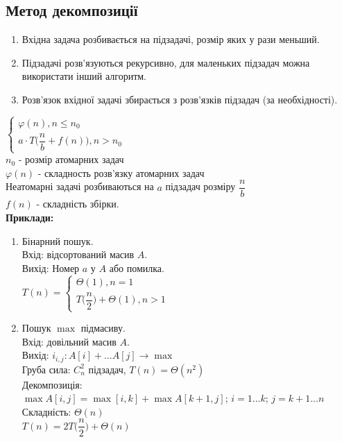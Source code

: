 \documentclass[a4paper,12pt]{article}
\begin{document}
    \subsection{Метод декомпозиції}
    \begin{enumerate}
        \item Вхідна задача розбивається на підзадачі, розмір яких у рази меньший.
        \item Підзадачі розв'язуються рекурсивно, для маленьких підзадач можна використати інший алгоритм.
        \item Розв'язок вхідної задачі збирається з розв'язків підзадач (за необхідності).
    \end{enumerate}
    $\begin{cases}
        \varphi(n), n\leqslant n_0 \\
        a\cdot T\Biggl(\dfrac{n}{b}+f(n)\Biggr), n>n_0
    \end{cases}$ \\
    $n_0$ - розмір атомарних задач \\
    $\varphi(n)$ - складность розв'язку атомарних задач \\
    Неатомарні задачі розбиваються на $a$ підзадач розміру $\dfrac{n}{b}$ \\
    $f(n)$ - складність збірки. \\
    \textbf{Приклади:}
    \begin{enumerate}
        \item Бінарний пошук. \\
        Вхід: відсортований масив $A$. \\
        Вихід: Номер $a$ у $A$ або помилка. \\
        $T(n)=\begin{cases}
            \Theta(1), n=1 \\
            T\Biggl(\dfrac{n}{2}\Biggr)+\Theta(1), n>1
        \end{cases}$        
        \item Пошук $\max$ підмасиву. \\
        Вхід: довільний масив $A$. \\
        Вихід: $i_{i,j}: A[i]+...A[j]\rightarrow\max$ \\
        Груба сила: $C_n^2$ підзадач, $T(n)=\Theta(n^2)$ \\
        Декомпозиція: \\
        $\max A[i,j]=\max[i,k]+\max A[k+1,j]$; $i=1...k$; $j=k+1...n$ \\
        Складність: $\Theta(n)$ \\
        $T(n)=2T\Biggl(\dfrac{n}{2}\Biggr)+\Theta(n)$
    \end{enumerate}
\end{document}
